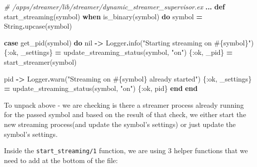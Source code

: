 \documentclass[
]{book}
\newenvironment{Shaded}{\begin{snugshade}}{\end{snugshade}}
\newcommand{\CommentTok}[1]{\textcolor[rgb]{0.56,0.35,0.01}{\textit{#1}}}
\newcommand{\ConstantTok}[1]{\textcolor[rgb]{0.00,0.00,0.00}{#1}}
\newcommand{\KeywordTok}[1]{\textcolor[rgb]{0.13,0.29,0.53}{\textbf{#1}}}
\newcommand{\NormalTok}[1]{#1}
\newcommand{\OperatorTok}[1]{\textcolor[rgb]{0.81,0.36,0.00}{\textbf{#1}}}
\newcommand{\OtherTok}[1]{\textcolor[rgb]{0.56,0.35,0.01}{#1}}
\newcommand{\StringTok}[1]{\textcolor[rgb]{0.31,0.60,0.02}{#1}}
\newcommand{\VariableTok}[1]{\textcolor[rgb]{0.00,0.00,0.00}{#1}}
\begin{document}
\begin{Shaded}
\begin{Highlighting}[]
\CommentTok{\# /apps/streamer/lib/streamer/dynamic\_streamer\_supervisor.ex}
  \OperatorTok{...}
  \KeywordTok{def}\NormalTok{ start\_streaming(symbol) }\KeywordTok{when}\NormalTok{ is\_binary(symbol) }\KeywordTok{do}
\NormalTok{    symbol }\OperatorTok{=} \ConstantTok{String}\OperatorTok{.}\NormalTok{upcase(symbol)}
    
    \KeywordTok{case}\NormalTok{ get\_pid(symbol) }\KeywordTok{do}
      \ConstantTok{nil} \OperatorTok{{-}\textgreater{}}
        \ConstantTok{Logger}\OperatorTok{.}\NormalTok{info(}\StringTok{"Starting streaming on }\OtherTok{\#\{}\NormalTok{symbol}\OtherTok{\}}\StringTok{"}\NormalTok{)}
\NormalTok{        \{}\VariableTok{:ok}\NormalTok{, \_settings\} }\OperatorTok{=}\NormalTok{ update\_streaming\_status(symbol, }\StringTok{"on"}\NormalTok{)}
\NormalTok{        \{}\VariableTok{:ok}\NormalTok{, \_pid\} }\OperatorTok{=}\NormalTok{ start\_streamer(symbol)}

\NormalTok{      pid }\OperatorTok{{-}\textgreater{}}
        \ConstantTok{Logger}\OperatorTok{.}\NormalTok{warn(}\StringTok{"Streaming on }\OtherTok{\#\{}\NormalTok{symbol}\OtherTok{\}}\StringTok{ already started"}\NormalTok{)}
\NormalTok{        \{}\VariableTok{:ok}\NormalTok{, \_settings\} }\OperatorTok{=}\NormalTok{ update\_streaming\_status(symbol, }\StringTok{"on"}\NormalTok{)}
\NormalTok{        \{}\VariableTok{:ok}\NormalTok{, pid\}}
    \KeywordTok{end}
  \KeywordTok{end}
\end{Highlighting}
\end{Shaded}

To unpack above - we are checking is there a streamer process already running for the passed symbol and based on the result of that check, we either start the new streaming process(and update the symbol's settings) or just update the symbol's settings.

Inside the \texttt{start\_streaming/1} function, we are using 3 helper functions that we need to add at the bottom of the file:
\end{document}
